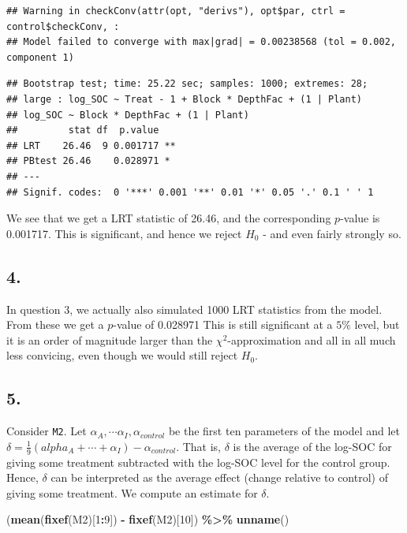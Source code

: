 \documentclass[
]{article}
\newenvironment{Shaded}{\begin{snugshade}}{\end{snugshade}}
\newcommand{\DecValTok}[1]{\textcolor[rgb]{0.00,0.00,0.81}{#1}}
\newcommand{\FunctionTok}[1]{\textcolor[rgb]{0.13,0.29,0.53}{\textbf{#1}}}
\newcommand{\NormalTok}[1]{#1}
\newcommand{\SpecialCharTok}[1]{\textcolor[rgb]{0.81,0.36,0.00}{\textbf{#1}}}
\begin{document}
\begin{verbatim}
## Warning in checkConv(attr(opt, "derivs"), opt$par, ctrl = control$checkConv, :
## Model failed to converge with max|grad| = 0.00238568 (tol = 0.002, component 1)
\end{verbatim}

\begin{verbatim}
## Bootstrap test; time: 25.22 sec; samples: 1000; extremes: 28;
## large : log_SOC ~ Treat - 1 + Block * DepthFac + (1 | Plant)
## log_SOC ~ Block * DepthFac + (1 | Plant)
##         stat df  p.value   
## LRT    26.46  9 0.001717 **
## PBtest 26.46    0.028971 * 
## ---
## Signif. codes:  0 '***' 0.001 '**' 0.01 '*' 0.05 '.' 0.1 ' ' 1
\end{verbatim}

We see that we get a LRT statistic of 26.46, and the corresponding
\(p\)-value is 0.001717. This is significant, and hence we reject
\(H_0\) - and even fairly strongly so.

\hypertarget{section-7}{%
\subsection{4.}\label{section-7}}

In question 3, we actually also simulated 1000 LRT statistics from the
model. From these we get a \(p\)-value of 0.028971 This is still
significant at a \(5\%\) level, but it is an order of magnitude larger
than the \(\chi^2\)-approximation and all in all much less convicing,
even though we would still reject \(H_0\).

\hypertarget{section-8}{%
\subsection{5.}\label{section-8}}

Consider \texttt{M2}. Let
\(\alpha_A, \cdots \alpha_I, \alpha_{control}\) be the first ten
parameters of the model and let
\(\delta = \frac{1}{9} (alpha_A + \cdots + \alpha_I) - \alpha_{control}\).
That is, \(\delta\) is the average of the log-SOC for giving some
treatment subtracted with the log-SOC level for the control group.
Hence, \(\delta\) can be interpreted as the average effect (change
relative to control) of giving some treatment. We compute an estimate
for \(\delta\).

\begin{Shaded}
\begin{Highlighting}[]
\NormalTok{(}\FunctionTok{mean}\NormalTok{(}\FunctionTok{fixef}\NormalTok{(M2)[}\DecValTok{1}\SpecialCharTok{:}\DecValTok{9}\NormalTok{]) }\SpecialCharTok{{-}} \FunctionTok{fixef}\NormalTok{(M2)[}\DecValTok{10}\NormalTok{]) }\SpecialCharTok{\%\textgreater{}\%} \FunctionTok{unname}\NormalTok{()}
\end{Highlighting}
\end{Shaded}
\end{document}
